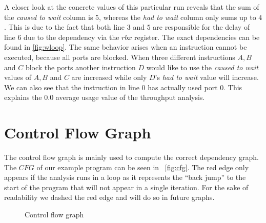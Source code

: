 A closer look at the concrete values of this particular run reveals that the sum of the \emph{caused to wait} column is $5$, whereas the \emph{had to wait} column only sums up to $4$. This is due to the fact that both line $3$ and $5$ are responsible for the delay of line $6$ due to the dependency via the $rbx$ register. The exact dependencies can be found in \autoref{fig:wloop}. The same behavior arises when an instruction cannot be executed, because all ports are blocked. When three different instructions $A, B$ and $C$ block the ports another instruction $D$ would like to use the \emph{caused to wait} values of $A, B$ and $C$ are increased while only $D$'s \emph{had to wait} value will increase.\\
We can also see that the instruction in line $0$ has actually used port $0$. This explains the $0.0$ average usage value of the throughput analysis.

\section{Control Flow Graph}
The control flow graph is mainly used to compute the correct dependency graph. The $CFG$ of our example program can be seen in ~\autoref{fig:cfg}. The red edge only appears if the analysis runs in a loop as it represents the ``back jump'' to the start of the program that will not appear in a single iteration. For the sake of readability we dashed the red edge and will do so in future graphs.

\begin{figure}
    \centering
    \caption{Control flow graph}
    \label{fig:cfg}
\end{figure}

